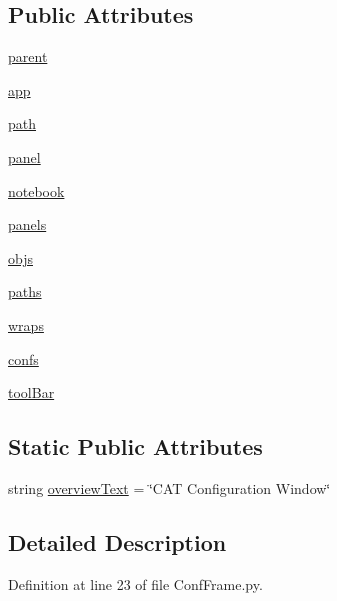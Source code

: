 \subsection*{Public Attributes}
\begin{DoxyCompactItemize}
\item 
\hyperlink{classConfFrame_1_1ConfFrame_a1943cba9d33cfcae85f83c0777150288}{parent}
\item 
\hyperlink{classConfFrame_1_1ConfFrame_a533aacde2742b806cb8e8161a5360796}{app}
\item 
\hyperlink{classConfFrame_1_1ConfFrame_a1f47cd72745073b992e1ccee6d1190d7}{path}
\item 
\hyperlink{classConfFrame_1_1ConfFrame_aaca068730fdc7eb3f4ba7847bbb82329}{panel}
\item 
\hyperlink{classConfFrame_1_1ConfFrame_a0e2f293545e00f6762d635713f98942a}{notebook}
\item 
\hyperlink{classConfFrame_1_1ConfFrame_ae64b58d8e2f4dde0e65db414e4172d77}{panels}
\item 
\hyperlink{classConfFrame_1_1ConfFrame_a8d6caf98ca21d47a6e1988ed20f5a688}{objs}
\item 
\hyperlink{classConfFrame_1_1ConfFrame_a7fa64be7e4b3602d7b4ce881b87a0d5e}{paths}
\item 
\hyperlink{classConfFrame_1_1ConfFrame_a787b2c045a34b615b110e2cdf98c4c49}{wraps}
\item 
\hyperlink{classConfFrame_1_1ConfFrame_a253abaeccaa1d61319f723486bd3ab51}{confs}
\item 
\hyperlink{classConfFrame_1_1ConfFrame_ae34c2fb369a3a0b3cff4724f1c8e8a01}{tool\+Bar}
\end{DoxyCompactItemize}
\subsection*{Static Public Attributes}
\begin{DoxyCompactItemize}
\item 
string \hyperlink{classConfFrame_1_1ConfFrame_a65a5a2c5440955179d5b471875f1046d}{overview\+Text} = \char`\"{}C\+AT Configuration Window\char`\"{}
\end{DoxyCompactItemize}


\subsection{Detailed Description}


Definition at line 23 of file Conf\+Frame.\+py.



